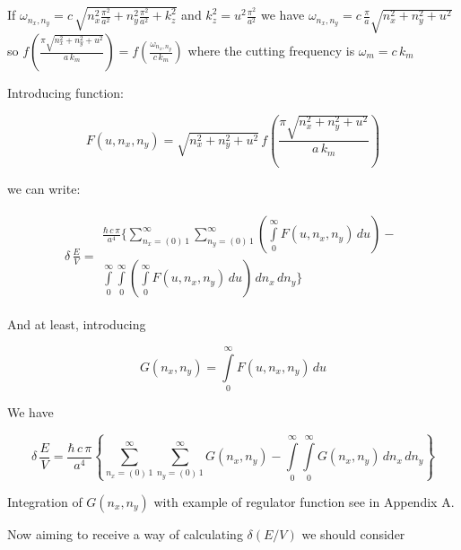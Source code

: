 \documentclass[11pt]{article}
\begin{document}
    If
\(\omega _{n_x,n_y} = c\,\sqrt{n_x^2\frac{\pi^2}{a^2}+n_y^2\frac{\pi^2}{a^2}+k_z^2}\)
and \(k_z^2 = u^2 \frac{\pi^2}{a^2}\) we have
\(\omega _{n_x,n_y} = c \, \frac{\pi}{a} \sqrt{n_x^2+n_y^2+u^2}\) so
\(f\left(\frac{\pi\sqrt{n_x^2 + n_y^2+u^2}}{a\,k_m}\right) = f\left(\frac{\omega _{n_x,n_y}}{c\,k_m}\right)\)
where the cutting frequency is \(\omega_m = c\,k_m\)

    Introducing function:

    \begin{equation}
F\left(u, n_x, n_y\right) = 
\sqrt{n_x^2 + n_y^2+u^2}\,
f\left(\frac{\pi\sqrt{n_x^2 + n_y^2+u^2}}{a\,k_m}\right)
\end{equation}

    we can write:

    \begin{equation}
\begin{array}{lr}
\delta\,\frac{E}{V} =
\begin{array}{c}
\frac{\hbar\,c\,\pi}{a^4}
\Bigg\{
\sum\limits_{n_x=\left(0\right)\,1}^{\infty}
\sum\limits_{n_y=\left(0\right)\,1}^{\infty}
\left(\int\limits_{0}^{\infty}F\left(u, n_x, n_y\right)\,d{u}\right)
- \\
\int\limits_{0}^{\infty}
\int\limits_{0}^{\infty}
\left(\int\limits_{0}^{\infty}F\left(u, n_x, n_y\right)\,d{u}\right)
\,d{n_x}\,d{n_y}
\Bigg\}
\end{array}
\end{array}
\end{equation}

    And at least, introducing

    \begin{equation}
G\left(n_x, n_y\right) = \int\limits_{0}^{\infty}F\left(u, n_x, n_y\right)\,d{u}
\end{equation}

    We have

    \begin{equation}
\delta\,\frac{E}{V} = \frac{\hbar\,c\,\pi}{a^4}
\left\{
\sum\limits_{n_x=\left(0\right)\,1}^{\infty}
\sum\limits_{n_y=\left(0\right)\,1}^{\infty}
G\left(n_x, n_y\right)
-
\int\limits_{0}^{\infty}
\int\limits_{0}^{\infty}
G\left(n_x, n_y\right)
\,d{n_x}\,d{n_y}
\right\}
\end{equation}

Integration of \(G\left(n_x, n_y\right)\) with example of regulator
function see in Appendix A.

    Now aiming to receive a way of calculating \(\delta\left(E/V\right)\) we
should consider
\end{document}
